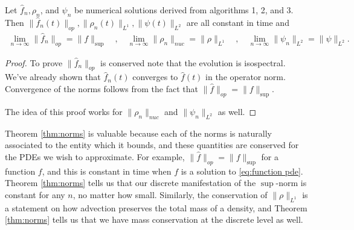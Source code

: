 \documentclass[final,leqno]{siamltex1213}
\begin{document}
\begin{theorem} \label{thm:norms}
	Let $\hat{f}_{n}, \rho_{n}$, and $\psi_{n}$ be numerical solutions derived from algorithms 1, 2, and 3.
	Then $\| \hat{f}_{n}(t) \|_{op}, \|\rho_{n}(t)\|_{L^{1}} , \| \psi (t)\|_{L^{2}}$ are all constant in time
	and
	\begin{align}
		\lim_{n \to \infty} \| \hat{f}_{n} \|_{op} = \| f \|_{\sup} \quad,\quad
		\lim_{n \to \infty} \| \rho_{n} \|_{nuc} = \| \rho \|_{L^{1}} \quad,\quad
		\lim_{n \to \infty} \| \psi_{n} \|_{L^{2}} = \| \psi \|_{L^{2}}.
	\end{align}
\end{theorem}
\begin{proof}
	To prove $\| \hat{f}_{n} \|_{op}$ is conserved note that the evolution is isospectral.
	We've already shown that $\hat{f}_{n}(t)$ converges to $\hat{f}(t)$ in the operator norm.
	Convergence of the norms follows from the fact that $\| \hat{f} \|_{op} = \| f \|_{\sup}$.
	
	The idea of this proof works for $\| \rho_{n} \|_{nuc}$ and $\| \psi_{n} \|_{L^{2}}$ as well.
\end{proof}

Theorem \ref{thm:norms} is valuable because each of the norms is naturally associated to the entity which it bounds, and these quantities are conserved for the PDEs we wish to approximate.
For example, $\| \hat{f} \|_{op} = \| f \|_{\sup}$ for a function $f$, and this is constant in time when $f$ is a solution to \eqref{eq:function pde}.
Theorem \ref{thm:norms} tells us that our discrete manifestation of the $\sup$-norm is constant for any $n$, no matter how small.
Similarly, the conservation of $\| \rho \|_{L^{1}}$ is a statement on how advection preserves the total mass of a density, and Theorem \ref{thm:norms} tells us that we have mass conservation at the discrete level as well.
\end{document}
